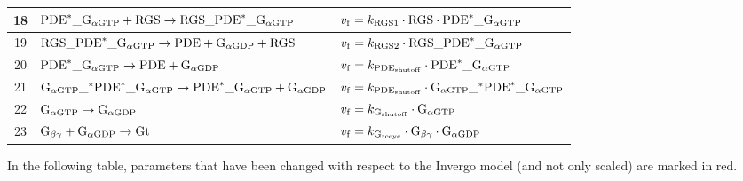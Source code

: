 \documentclass[a4paper, 12pt]{book}
\begin{document}
\begin{table}[H]
\begin{tabular}{c | l | l}
\hline
18 & ${\rm PDE}^{*}\_{\rm G}_{\alpha{\rm GTP}} + {\rm RGS} \rightarrow {\rm RGS}\_{\rm PDE}^{*}\_{\rm G}_{\alpha{\rm GTP}}$ & $v_{\rm f} =  k_{\rm RGS1} \cdot {\rm RGS} \cdot {\rm PDE}^{*}\_{\rm G}_{\alpha{\rm GTP}} $\\
\hline
19 & ${\rm RGS}\_{\rm PDE}^{*}\_{\rm G}_{\alpha{\rm GTP}} \rightarrow {\rm PDE} + {\rm G}_{\alpha{\rm GDP}} + {\rm RGS} $ & $v_{\rm f} =  k_{\rm RGS2} \cdot {\rm RGS}\_{\rm PDE}^{*}\_{\rm G}_{\alpha{\rm GTP}} $\\
\hline
20 & ${\rm PDE}^{*}\_{\rm G}_{\alpha{\rm GTP}} \rightarrow {\rm PDE} + {\rm G}_{\alpha{\rm GDP}} $ & $v_{\rm f} =  k_{\rm PDE_{shutoff}} \cdot {\rm PDE}^{*}\_{\rm G}_{\alpha{\rm GTP}} $\\
\hline
21 & ${\rm G}_{\alpha{\rm GTP}}\_{\rm {}^{*} PDE}^{*}\_{\rm G}_{\alpha{\rm GTP}} \rightarrow {\rm PDE}^{*}\_{\rm G}_{\alpha{\rm GTP}} + {\rm G}_{\alpha{\rm GDP}} $ & $v_{\rm f} =  k_{\rm PDE_{shutoff}} \cdot {\rm G}_{\alpha{\rm GTP}}\_{\rm {}^{*} PDE}^{*}\_{\rm G}_{\alpha{\rm GTP}} $\\
\hline
22 & ${\rm G}_{\alpha{\rm GTP}} \rightarrow {\rm G}_{\alpha{\rm GDP}}$ & $v_{\rm f} =  k_{\rm G_{shutoff}} \cdot {\rm G}_{\alpha{\rm GTP}}$\\
\hline
23 & $ {\rm G}_{\beta\gamma} + {\rm G}_{\alpha{\rm GDP}} \rightarrow {\rm Gt}$ & $v_{\rm f} =  k_{\rm G_{recyc}} \cdot  {\rm G}_{\beta\gamma} \cdot {\rm G}_{\alpha{\rm GDP}} $\\
\hline
\end{tabular}
\end{table}
\restoregeometry

In the following table, parameters that have been changed with respect to the Invergo model (and not only scaled) are marked in red.
\end{document}
